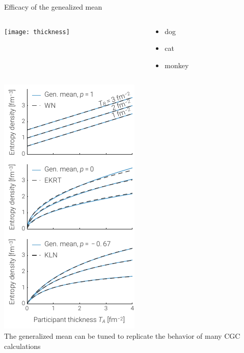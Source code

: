 \documentclass[xcolor=dvipsnames]{beamer}
\begin{document}
\begin{frame}{Efficacy of the genealized mean}
    \vspace{0.4 cm}
    \begin{columns}
        \begin{column}{0.5\textwidth}
            \texttt{[image: thickness]} 
        \end{column}
        \begin{column}{0.5\textwidth}
            \centering
            \begin{itemize}
                \item dog
                \item cat
                \item monkey
            \end{itemize}
        \end{column}
    \end{columns}
    \vspace{0.2 cm}
    \begin{columns}
        \begin{column}{\textwidth}
            \includegraphics{cgc_compare} \\
            \scriptsize
            The generalized mean can be tuned to replicate the behavior of many CGC calculations
        \end{column}
    \end{columns}
\end{frame}
\end{document}
